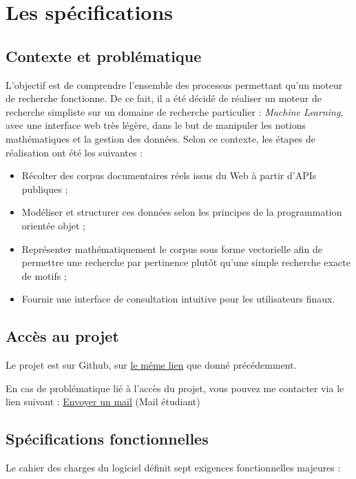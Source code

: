 \documentclass[12pt,a4paper]{article}
\begin{document}
\newpage
\tableofcontents
\newpage

\section{Les spécifications}
\subsection{Contexte et problématique}

L'objectif est de comprendre l'ensemble des processus permettant qu'un moteur de recherche fonctionne. De ce fait, il a été décidé de réaliser un moteur de recherche simpliste sur un domaine de recherche particulier : \textit{Machine Learning}, avec une interface web très légère, dans le but de manipuler les notions mathématiques et la gestion des données. Selon ce contexte, les étapes de réalisation ont été les suivantes :

\begin{itemize}
    \item Récolter des corpus documentaires réels issus du Web à partir d'APIs publiques ;
    \item Modéliser et structurer ces données selon les principes de la programmation orientée objet ;
    \item Représenter mathématiquement le corpus sous forme vectorielle afin de permettre une recherche par pertinence plutôt qu'une simple recherche exacte de motifs ;
    \item Fournir une interface de consultation intuitive pour les utilisateurs finaux.
\end{itemize}

\subsection{Accès au projet}

Le projet est sur Github, sur \href{https://github.com/Ashzuu/SearchEngine}{le même lien} que donné précédemment.

En cas de problématique lié à l'accès du projet, vous pouvez me contacter via le lien suivant : \href{mailto:evan.dynak@univ-lyon2.fr}{Envoyer un mail} (Mail étudiant)

\subsection{Spécifications fonctionnelles}

Le cahier des charges du logiciel définit sept exigences fonctionnelles majeures :
\end{document}
